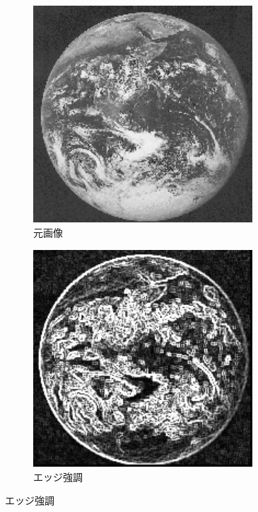 \documentclass[a4paper,12pt]{jsarticle}
\begin{document}
\begin{figure}[!htbp]
\centering
\begin{subfigure}[b]{0.45\textwidth}
    \centering
    \includegraphics[width=0.9\textwidth]{./sampleimages/sample5.png}
    \caption{元画像}
\end{subfigure}
\hfill
\begin{subfigure}[b]{0.45\textwidth}
    \centering
    \includegraphics[width=0.9\textwidth]{./images/edge_enhanced_sample5_edge.png}
    \caption{エッジ強調}
\end{subfigure}


\end{figure}
\end{document}
